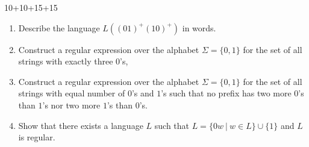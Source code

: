 \begin{exercise}{10+10+15+15}
    \begin{enumerate}
        \item Describe the language $L((01)^+(10)^+)$ in words. 
        \item Construct a regular expression over the alphabet $\Sigma=\{0,1\}$ for the set of all strings with exactly three $0$'s,
        \item Construct a regular expression over the alphabet $\Sigma=\{0,1\}$ for the set of all strings with equal number of $0$'s and $1$'s such that no prefix has two more $0$'s than $1$'s nor two more $1$'s than $0$'s.
        \item Show that there exists a language $L$ such that $L=\{0 w \ |\ w\in L\} \cup \{ 1 \}$ and $L$ is regular.
    \end{enumerate}
\end{exercise}

